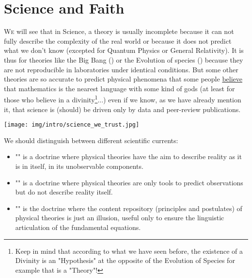 	\newpage
	\thispagestyle{empty}
	\mbox{}
	\section{Science and Faith}
	\lettrine[lines=4]{\color{BrickRed}W}e will see that in Science, a theory is usually incomplete because it can not fully describe the complexity of the real world or because it does not predict what we don't know (excepted for Quantum Physics or General Relativity). It is thus for theories like the Big Bang () or the Evolution of species () because they are not reproducible in laboratories under identical conditions.  But some other theories are so accurate to predict physical phenomena that some people \underline{believe} that mathematics is the nearest language with some kind of gods (at least for those who believe in a divinity\footnote{Keep in mind that according to what we have seen before, the existence of a Divinity is an "Hypothesis" at the opposite of the Evolution of Species for example that is a "Theory"!}...) even if we know, as we have already mention it, that science is (should) be driven only by data and peer-review publications.
	\begin{center}
		\texttt{[image: img/intro/science\_we\_trust.jpg]}
	\end{center}	

	We should distinguish between different scientific currents: 
	\begin{itemize}
		\item "" is a doctrine where physical theories have the aim to describe reality as it is in itself, in its unobservable components. 
	
		\item "" is a doctrine where physical theories are only tools to predict observations but do not describe reality itself. 
	
		\item "" is the doctrine where the content repository (principles and postulates) of physical theories is just an illusion, useful only to ensure the linguistic articulation of the fundamental equations. 
	\end{itemize}

